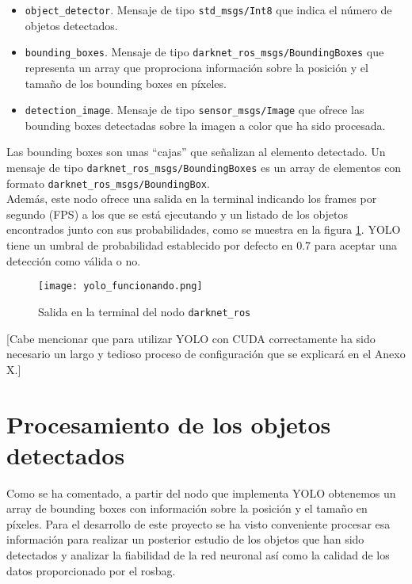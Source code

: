 \begin{itemize}

	\item \texttt{object\_detector}. Mensaje de tipo \texttt{std\_msgs/Int8} que indica el número de objetos detectados.
	\item \texttt{bounding\_boxes}. Mensaje de tipo \texttt{darknet\_ros\_msgs/BoundingBoxes} que representa un array que proprociona información sobre la posición y el tamaño de los bounding boxes en píxeles.
	\item \texttt{detection\_image}. Mensaje de tipo \texttt{sensor\_msgs/Image} que ofrece las bounding boxes detectadas sobre la imagen a color que ha sido procesada.
	
\end{itemize}

Las bounding boxes son unas ``cajas'' que señalizan al elemento detectado. Un mensaje de tipo \texttt{darknet\_ros\_msgs/BoundingBoxes} es un array de elementos con formato \texttt{darknet\_ros\_msgs/BoundingBox}.\\

Además, este nodo ofrece una salida en la terminal indicando los frames por segundo (FPS) a los que se está ejecutando y un listado de los objetos encontrados junto con sus probabilidades, como se muestra en la figura \ref{fig:yolo_funcionando}. YOLO tiene un umbral de probabilidad establecido por defecto en $0.7$ para aceptar una detección como válida o no. \\

\begin{figure}[h]
	\begin{center} 
		\texttt{[image: yolo\_funcionando.png]}
	\end{center}
	\caption{Salida en la terminal del nodo \texttt{darknet\_ros}}
	\label{fig:yolo_funcionando}
\end{figure}

[Cabe mencionar que para utilizar YOLO con CUDA correctamente ha sido necesario un largo y tedioso proceso de configuración que se explicará en el Anexo X.]\\

\section{Procesamiento de los objetos detectados}

Como se ha comentado, a partir del nodo que implementa YOLO obtenemos un array de bounding boxes con información sobre la posición y el tamaño en píxeles. Para el desarrollo de este proyecto se ha visto conveniente procesar esa información para realizar un posterior estudio de los objetos que han sido detectados y analizar la fiabilidad de la red neuronal así como la calidad de los datos proporcionado por el rosbag.\\

